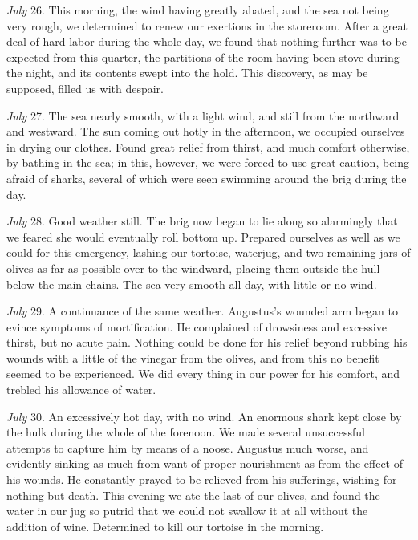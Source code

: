 \emph{July} 26. This morning, the wind having greatly abated, and the sea not
being very rough, we determined to renew our exertions in the storeroom. After a
great deal of hard labor during the whole day, we found that nothing further was
to be expected from this quarter, the partitions of the room having been stove
during the night, and its contents swept into the hold. This discovery, as may
be supposed, filled us with despair. 

\emph{July} 27. The sea nearly smooth, with a light wind, and still from the
northward and westward. The sun coming out hotly in the afternoon, we occupied
ourselves in drying our clothes. Found great relief from thirst, and much
comfort otherwise, by bathing in the sea; in this, however, we were forced to
use great caution, being afraid of sharks, several of which were seen swimming
around the brig during the day. 

\emph{July} 28. Good weather still. The brig now began to lie along so
alarmingly that we feared she would eventually roll bottom up. Prepared
ourselves as well as we could for this emergency, lashing our tortoise,
waterjug, and two remaining jars of olives as far as possible over to the
windward, placing them outside the hull below the main-chains. The sea very
smooth all day, with little or no wind. 

\emph{July} 29. A continuance of the same weather. Augustus's wounded arm
began to evince symptoms of mortification. He complained of drowsiness and
excessive thirst, but no acute pain. Nothing could be done for his relief beyond
rubbing his wounds with a little of the vinegar from the olives, and from this
no benefit seemed to be experienced. We did every thing in our power for his
comfort, and trebled his allowance of water. 

\emph{July} 30. An excessively hot day, with no wind. An enormous shark kept
close by the hulk during the whole of the forenoon. We made several unsuccessful
attempts to capture him by means of a noose. Augustus much worse, and evidently
sinking as much from want of proper nourishment as from the effect of his
wounds. He constantly prayed to be relieved from his sufferings, wishing for
nothing but death. This evening we ate the last of our olives, and found the
water in our jug so putrid that we could not swallow it at all without the
addition of wine. Determined to kill our tortoise in the morning. 


